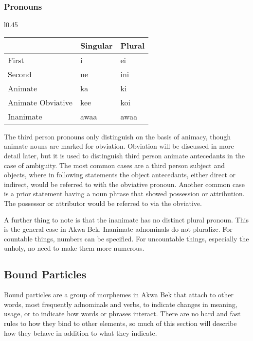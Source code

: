 \documentclass[11pt,letterpaper]{article}
\begin{document}
    \subsubsection{Pronouns}
    \label{pronouns}
    \begin{wrapfigure}{l}{0.45\textwidth}
      \begin{tabular}{|l|l|l|}
        \hline
                            & Singular  & Plural \\ \hline \hline
        First               & i         & ei     \\
        Second              & ne        & ini    \\
        Animate             & ka        & ki     \\
        Animate Obviative   & kee       & koi    \\
        Inanimate           & awaa      & awaa   \\ \hline
      \end{tabular}
    \end{wrapfigure}
    The third person pronouns only distinguish on the basis of animacy, though animate nouns are marked for obviation. Obviation will be discussed in more detail later, but it is used to distinguish third person animate antecedants in the case of ambiguity. The most common cases are a third person subject and objects, where in following statements the object antecedants, either direct or indirect, would be referred to with the obviative pronoun. Another common case is a prior statement having a noun phrase that showed possession or attribution. The possessor or attributor would be referred to via the obviative.
    \par
    A further thing to note is that the inanimate has no distinct plural pronoun. This is the general case in Akwa Bek. Inanimate adnominals do not pluralize. For countable things, numbers can be specified. For uncountable things, especially the unholy, no need to make them more numerous.

  \subsection{Bound Particles}
  \label{boundparticles}
  Bound particles are a group of morphemes in Akwa Bek that attach to other words, most frequently adnominals and verbs, to indicate changes in meaning, usage, or to indicate how words or phrases interact. There are no hard and fast rules to how they bind to other elements, so much of this section will describe how they behave in addition to what they indicate.
\end{document}
